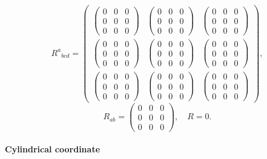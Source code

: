 \documentclass[11pt]{article}
\begin{document}
$${R^{a}}_{bcd}=\begin{pmatrix} \begin{pmatrix} 0 & 0 & 0\\ 0 & 0 & 0\\ 0 & 0 & 0 \end{pmatrix} & \begin{pmatrix} 0 & 0 & 0\\ 0 & 0 & 0\\ 0 & 0 & 0 \end{pmatrix} & \begin{pmatrix} 0 & 0 & 0\\ 0 & 0 & 0\\ 0 & 0 & 0 \end{pmatrix}\\ \begin{pmatrix} 0 & 0 & 0\\ 0 & 0 & 0\\ 0 & 0 & 0 \end{pmatrix} & \begin{pmatrix} 0 & 0 & 0\\ 0 & 0 & 0\\ 0 & 0 & 0 \end{pmatrix} & \begin{pmatrix} 0 & 0 & 0\\ 0 & 0 & 0\\ 0 & 0 & 0 \end{pmatrix}\\ \begin{pmatrix} 0 & 0 & 0\\ 0 & 0 & 0\\ 0 & 0 & 0 \end{pmatrix} & \begin{pmatrix} 0 & 0 & 0\\ 0 & 0 & 0\\ 0 & 0 & 0 \end{pmatrix} & \begin{pmatrix} 0 & 0 & 0\\ 0 & 0 & 0\\ 0 & 0 & 0 \end{pmatrix} \end{pmatrix},$$
$$R_{ab}=\begin{pmatrix} 0 & 0 & 0\\ 0 & 0 & 0\\ 0 & 0 & 0 \end{pmatrix},\quad R=0.$$

    \hypertarget{cylindrical-coordinate}{%
\paragraph{Cylindrical coordinate}\label{cylindrical-coordinate}}
\end{document}
